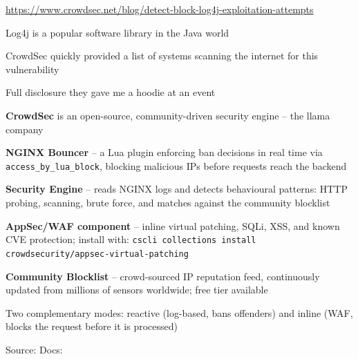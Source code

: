 \documentclass[Screen16to9,17pt]{foils}
\begin{document}
\url{https://www.crowdsec.net/blog/detect-block-log4j-exploitation-attempts}


\begin{list2}
\item Log4j is a popular software library in the Java world
\item CrowdSec quickly provided a list of systems scanning the internet for this vulnerability\\
\item Full disclosure they gave me a hoodie at an event \smiley
\end{list2}




\begin{list2}
\item {\bf CrowdSec} is an open-source, community-driven security engine -- the llama company 
\item {\bf NGINX Bouncer} -- a Lua plugin enforcing ban decisions in real time via \verb+access_by_lua_block+,
blocking malicious IPs before requests reach the backend
\item {\bf Security Engine} -- reads NGINX logs and detects behavioural patterns: HTTP probing,
scanning, brute force, and matches against the community blocklist
\item {\bf AppSec/WAF component} -- inline virtual patching, SQLi, XSS, and known CVE protection;
install with:
\verb+cscli collections install crowdsecurity/appsec-virtual-patching+
\item {\bf Community Blocklist} -- crowd-sourced IP reputation feed, continuously updated from
millions of sensors worldwide; free tier available
\item Two complementary modes: reactive (log-based, bans offenders) and
inline (WAF, blocks the request before it is processed)
\end{list2}
Source: Docs: 




\end{document}
